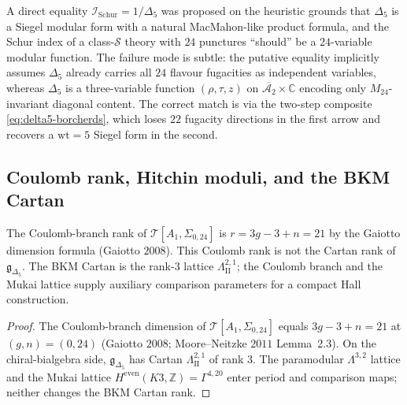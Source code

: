 \begin{remark}[Why direct Schur-\texorpdfstring{$=1/\Delta_5$}{=1/Delta-5} was tempting and wrong]
\label{rem:schur-delta5-trap}
A direct equality $\mathcal{I}_{\mathrm{Schur}} = 1/\Delta_5$ was proposed on
the heuristic grounds that $\Delta_5$ is a Siegel
modular form with a natural MacMahon-like product formula, and the Schur
index of a class-$\mathcal{S}$ theory with $24$ punctures ``should'' be a
$24$-variable modular function. The failure mode is subtle: the putative
equality implicitly assumes $\Delta_5$ already carries all $24$ flavour
fugacities as independent variables, whereas $\Delta_5$ is a three-variable
function $(\rho,\tau,z)$ on $\overline{\mathcal{A}_2}\times \mathbb{C}$
encoding only $M_{24}$-invariant diagonal content. The correct match is via
the two-step composite \eqref{eq:delta5-borcherds}, which loses $22$
fugacity directions in the first arrow and recovers a $\mathrm{wt}=5$ Siegel
form in the second.
\end{remark}

\subsection{Coulomb rank, Hitchin moduli, and the BKM Cartan}
\label{subsec:k3-coulomb-drinfeld}

\begin{proposition}
\label{prop:coulomb-drinfeld-cartan}
The Coulomb-branch rank of $\mathcal{T}[A_1,\Sigma_{0,24}]$ is $r = 3g - 3 + n = 21$
by the Gaiotto dimension formula (Gaiotto $2008$). This Coulomb rank is
not the Cartan rank of \(\mathfrak g_{\Delta_5}\). The BKM Cartan is the
rank-$3$ lattice \(\Lambda^{2,1}_{\mathrm{II}}\); the Coulomb branch and
the Mukai lattice supply auxiliary comparison parameters for a compact
Hall construction.
\end{proposition}

\begin{proof}
The Coulomb-branch dimension of $\mathcal{T}[A_1,\Sigma_{0,24}]$ equals
$3g - 3 + n = 21$ at $(g, n) = (0, 24)$ (Gaiotto $2008$; Moore--Neitzke
$2011$ Lemma~2.3).
On the chiral-bialgebra side,
\(\mathfrak{g}_{\Delta_5}\) has Cartan
\(\Lambda^{2,1}_{\mathrm{II}}\) of rank \(3\). The paramodular
\(\Lambda^{3,2}\) lattice and the Mukai lattice
\(H^{\mathrm{even}}(K3,\mathbb Z)=\Gamma^{4,20}\) enter period and
comparison maps; neither changes the BKM Cartan rank.
\end{proof}

